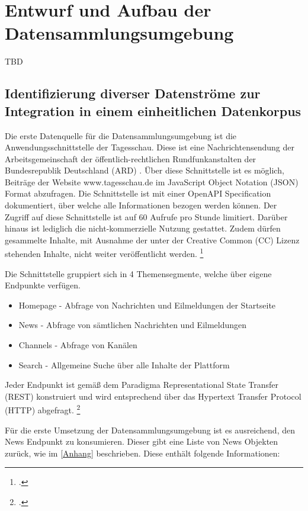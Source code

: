 \newpage
\section{Entwurf und Aufbau der Datensammlungsumgebung}
TBD

\subsection{Identifizierung diverser Datenströme zur Integration in einem einheitlichen Datenkorpus}
Die erste Datenquelle für die Datensammlungsumgebung ist die Anwendungsschnittstelle der Tagesschau. Diese ist eine Nachrichtensendung der Arbeitsgemeinschaft der öffentlich-rechtlichen Rundfunkanstalten der Bundesrepublik Deutschland (ARD) . Über diese Schnittstelle ist es möglich, Beiträge der Website www.tagesschau.de im JavaScript Object Notation (JSON) Format abzufragen. 
Die Schnittstelle ist mit einer OpenAPI Specification dokumentiert, über welche alle Informationen bezogen werden können. Der Zugriff auf diese Schnittstelle ist auf 60 Aufrufe pro Stunde limitiert. Darüber hinaus ist lediglich die nicht-kommerzielle Nutzung gestattet. Zudem dürfen gesammelte Inhalte, mit Ausnahme der unter der Creative Common (CC) Lizenz stehenden Inhalte, nicht weiter veröffentlicht werden. \footcite [Vgl.][]{Fischer.2024}

Die Schnittstelle gruppiert sich in 4 Themensegmente, welche über eigene Endpunkte verfügen. 
\begin{itemize}
    \item Homepage - Abfrage von Nachrichten und Eilmeldungen der Startseite
    \item News - Abfrage von sämtlichen Nachrichten und Eilmeldungen
    \item Channels - Abfrage von Kanälen
    \item Search - Allgemeine Suche über alle Inhalte der Plattform
\end{itemize}
Jeder Endpunkt ist gemäß dem Paradigma Representational State Transfer (REST) konstruiert und wird entsprechend über das Hypertext Transfer Protocol (HTTP) abgefragt. \footcite [Vgl.][]{Fischer.2024}
\newpage

Für die erste Umsetzung der Datensammlungsumgebung ist es ausreichend, den News Endpunkt zu konsumieren. Dieser gibt eine Liste von News Objekten zurück, wie im \ref{Anhang} beschrieben. Diese enthält folgende Informationen:

